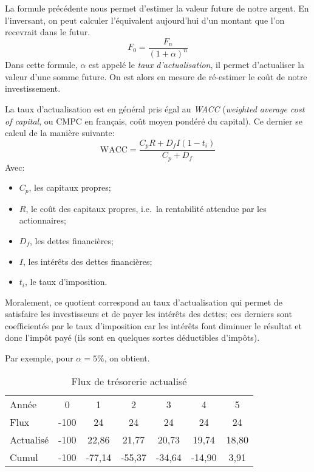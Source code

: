 La formule précédente nous permet d'estimer la valeur future 
de notre argent. En l'inversant, on peut calculer l'équivalent 
aujourd'hui d'un montant que l'on recevrait dans le futur.
\[ F_0 = \frac{F_n}{(1+\alpha)^n} \]
Dans cette formule, $\alpha$ est appelé le \emph{taux 
d'actualisation}, il permet d'actualiser la valeur d'une somme future.
On est alors en mesure de ré-estimer le coût de notre 
investissement.

La taux d'actualisation est en général pris égal au \emph{WACC} (\textit{weighted average cost of capital}, ou 
CMPC en français, coût moyen pondéré du capital).
Ce dernier se calcul de la manière suivante:
\begin{equation*}
\label{eq:WACC}
\mathrm{WACC} = \frac{C_p R + D_f I (1- t_i) }{C_p + D_f}
\end{equation*}
Avec:
\begin{itemize}
  \item $C_p$, les capitaux propres;
  \item $R$, le coût des capitaux propres, i.e.\ la rentabilité attendue par les actionnaires;
  \item $D_f$, les dettes financières;
  \item $I$, les intérêts des dettes financières;
  \item $t_i$, le taux d'imposition.
\end{itemize}

Moralement, ce quotient correspond au taux d'actualisation 
qui permet de satisfaire les investisseurs et de payer les 
intérêts des dettes; ces derniers sont coefficientés 
par le taux d'imposition car les intérêts font diminuer 
le résultat et donc l'impôt payé (ils sont en quelques sortes 
déductibles d'impôts).

Par exemple, pour $\alpha = 5\%$, on obtient.

\begin{table}[h]
\small
\centering
\begin{tabular}{|l|c|c|c|c|c|c|}
\hline
 Année & 0 & 1 & 2 & 3 & 4 & 5 \\
 Flux  & -100 & 24 & 24 & 24 & 24 & 24 \\
 Actualisé & -100 & 22,86 & 21,77 & 20,73 & 19,74 & 18,80 \\
 Cumul & -100 & -77,14 & -55,37 & -34,64 & -14,90 & 3,91 \\
\hline
\end{tabular}
\caption{Flux de trésorerie actualisé}
\end{table}

